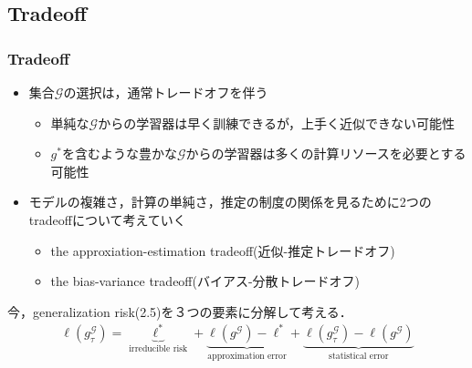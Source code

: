 \documentclass[dvipdfmx,cjk]{beamer}
\theoremstyle{example}
\begin{document}
\subsection{Tradeoff}
\begin{frame}
    \frametitle{Tradeoff}
    \begin{itemize}
        \item 集合$\mathcal{G}$の選択は，通常トレードオフを伴う
              \begin{itemize}
                  \item 単純な$\mathcal{G}$からの学習器は早く訓練できるが，上手く近似できない可能性
                  \item $g^*$を含むような豊かな$\mathcal{G}$からの学習器は多くの計算リソースを必要とする可能性
              \end{itemize}
        \item モデルの複雑さ，計算の単純さ，推定の制度の関係を見るために2つのtradeoffについて考えていく
              \begin{itemize}
                  \item the approxiation-estimation tradeoff(近似-推定トレードオフ)
                  \item the bias-variance tradeoff(バイアス-分散トレードオフ)
              \end{itemize}
    \end{itemize}
    今，generalization risk(2.5)を３つの要素に分解して考える．
    \begin{align*}
        \ell(g^\mathcal{G}_\tau)=\underbrace{\ell^*}_\text{irreducible risk}+\underbrace{\ell(g^\mathcal{G})-\ell^*}_\text{approximation error}+\underbrace{\ell(g^\mathcal{G}_\tau)-\ell(g^\mathcal{G})}_\text{statistical error} \tag{2.16}
    \end{align*}
\end{frame}
\end{document}
